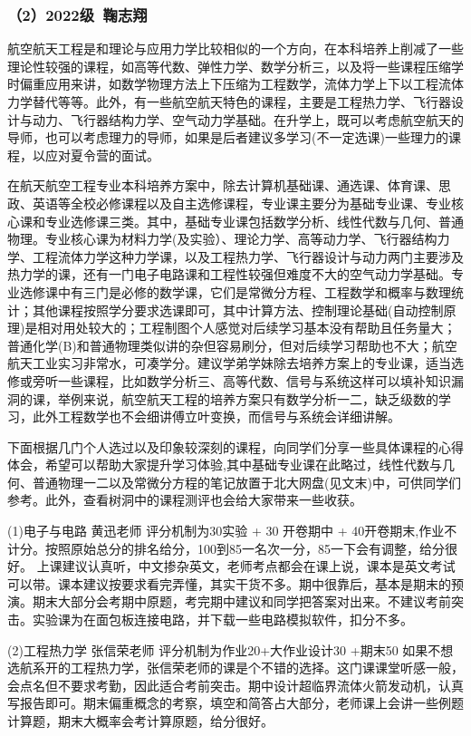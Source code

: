 \documentclass[11pt,oneside]{book}
\begin{document}
\subsubsection{（2）2022级\ 鞠志翔}

航空航天工程是和理论与应用力学比较相似的一个方向，在本科培养上削减了一些理论性较强的课程，如高等代数、弹性力学、数学分析三，以及将一些课程压缩学时偏重应用来讲，如数学物理方法上下压缩为工程数学，流体力学上下以工程流体力学替代等等。此外，有一些航空航天特色的课程，主要是工程热力学、飞行器设计与动力、飞行器结构力学、空气动力学基础。在升学上，既可以考虑航空航天的导师，也可以考虑理力的导师，如果是后者建议多学习(不一定选课)一些理力的课程，以应对夏令营的面试。

在航天航空工程专业本科培养方案中，除去计算机基础课、通选课、体育课、思政、英语等全校必修课程以及自主选修课程，专业课主要分为基础专业课、专业核心课和专业选修课三类。其中，基础专业课包括数学分析、线性代数与几何、普通物理。专业核心课为材料力学(及实验）、理论力学、高等动力学、飞行器结构力学、工程流体力学这种力学课，以及工程热力学、飞行器设计与动力两门主要涉及热力学的课，还有一门电子电路课和工程性较强但难度不大的空气动力学基础。专业选修课中有三门是必修的数学课，它们是常微分方程、工程数学和概率与数理统计；其他课程按照学分要求选课即可，其中计算方法、控制理论基础(自动控制原理)是相对用处较大的；工程制图个人感觉对后续学习基本没有帮助且任务量大；普通化学(B)和普通物理类似讲的杂但容易刷分，但对后续学习帮助也不大；航空航天工业实习非常水，可凑学分。建议学弟学妹除去培养方案上的专业课，适当选修或旁听一些课程，比如数学分析三、高等代数、信号与系统这样可以填补知识漏洞的课，举例来说，航空航天工程的培养方案只有数学分析一二，缺乏级数的学习，此外工程数学也不会细讲傅立叶变换，而信号与系统会详细讲解。

下面根据几门个人选过以及印象较深刻的课程，向同学们分享一些具体课程的心得体会，希望可以帮助大家提升学习体验,其中基础专业课在此略过，线性代数与几何、普通物理一二以及常微分方程的笔记放置于北大网盘(见文末)中，可供同学们参考。此外，查看树洞中的课程测评也会给大家带来一些收获。

(1)电子与电路 黄迅老师 
评分机制为30实验 + 30 开卷期中 + 40开卷期末,作业不计分。按照原始总分的排名给分，100到85一名次一分，85一下会有调整，给分很好。
上课建议认真听，中文掺杂英文，老师考点都会在课上说，课本是英文考试可以带。课本建议按要求看完弄懂，其实干货不多。期中很靠后，基本是期末的预演。期末大部分会考期中原题，考完期中建议和同学把答案对出来。不建议考前突击。实验课为在面包板连接电路，并下载一些电路模拟软件，扣分不多。

(2)工程热力学 张信荣老师
评分机制为作业20+大作业设计30 +期末50
如果不想选航系开的工程热力学，张信荣老师的课是个不错的选择。这门课课堂听感一般，会点名但不要求考勤，因此适合考前突击。期中设计超临界流体火箭发动机，认真写报告即可。期末偏重概念的考察，填空和简答占大部分，老师课上会讲一些例题计算题，期末大概率会考计算原题，给分很好。
\end{document}

